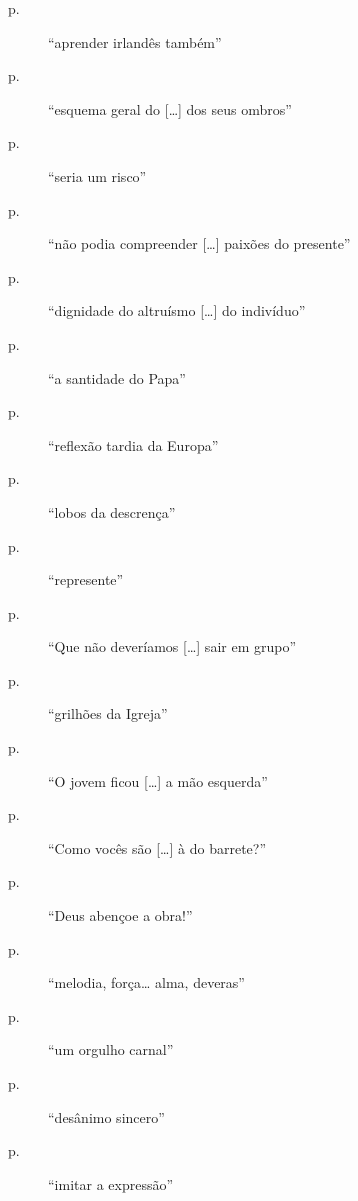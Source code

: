 \begin{description}
\item[p.~\pageref{aprender"-irlandes}]  ``aprender irlandês também''

\item[p.~\pageref{esquema"-geral}]  ``esquema geral do [\ldots] dos seus ombros''

\item[p.~\pageref{seria"-um}]  ``seria um risco''

\item[p.~\pageref{nao"-podia}]  ``não podia compreender [\ldots] paixões do presente''

\item[p.~\pageref{dignidade"-do}]  ``dignidade do altruísmo [\ldots] do indivíduo''

\item[p.~\pageref{a"-santidade}]  ``a santidade do Papa''

\item[p.~\pageref{reflexao"-tardia}]  ``reflexão tardia da Europa''

\item[p.~\pageref{lobos"-da}]  ``lobos da descrença''

\item[p.~\pageref{represente}]  ``represente''

\item[p.~\pageref{que"-nao}]  ``Que não deveríamos [\ldots] sair em grupo''

\item[p.~\pageref{grilhoes"-da}]  ``grilhões da Igreja''

\item[p.~\pageref{o"-jovem}]  ``O jovem ficou [\ldots] a mão esquerda''

\item[p.~\pageref{como"-voces}]  ``Como vocês são [\ldots] à do barrete?''

\item[p.~\pageref{deus"-abencoe}]  ``Deus abençoe a obra!''

\item[p.~\pageref{melodia}]  ``melodia, força\ldots{} alma, deveras''

\item[p.~\pageref{um"-orgulho}]  ``um orgulho carnal''

\item[p.~\pageref{desanimo"-sincero}]  ``desânimo sincero''

\item[p.~\pageref{imitar"-a}]  ``imitar a expressão''


\end{description}
